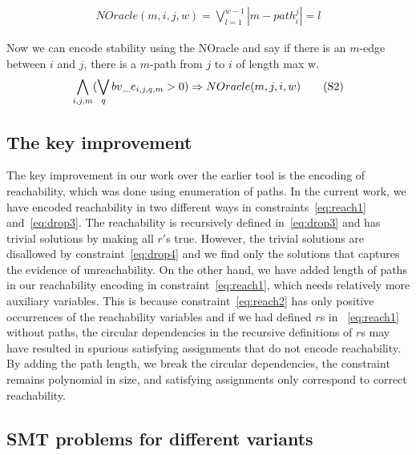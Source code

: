 
\begin{align}
NOracle (m, i, j, w) = \bigvee\limits_{l = 1}^{w-1} | {m-path}_i^j | = l
  \tag{S1}\label{eq:reachbmc1}
\end{align}

Now we can encode stability using the NOracle and say if there is an $m$-edge between $i$ and $j$, there is a $m$-path from $j$ to $i$ of length max w.
\begin{align}
 \bigwedge\limits_{i,j,m} (\bigvee_{q} bv\_e_{i,j,q,m} > 0) \Rightarrow NOracle(m, j, i, w)
  \tag{S2}\label{eq:reachbmc2}
\end{align}


\subsection{The key improvement}
The key improvement in our work over the earlier tool is the
encoding of reachability, which was done using enumeration of paths.
%
In the current work, we have encoded reachability in two different
ways in constraints~\eqref{eq:reach1} and~\eqref{eq:drop3}.
%
The reachability is recursively defined in~\eqref{eq:drop3} and has
trivial solutions by making all $r'$s true.
%
However, the trivial solutions are disallowed by constraint~\eqref{eq:drop4} and we find
only the solutions that captures the evidence of unreachability.
%
On the other hand,
we have added length of paths in our reachability encoding in constraint~\eqref{eq:reach1},
which needs relatively more auxiliary variables.
%
This is because constraint~\eqref{eq:reach2} has only positive
occurrences of the reachability variables and if we had defined
$r$s in ~\eqref{eq:reach1} without paths,
the circular dependencies in the recursive definitions of $r$s
may have resulted in spurious satisfying assignments that
do not encode reachability.
%
By adding the path length, we break the circular dependencies, the
constraint remains polynomial in size, and satisfying assignments only
correspond to correct reachability.

\subsection{SMT problems for different variants}

